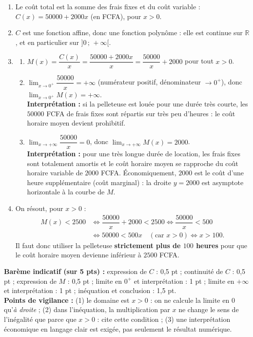 \documentclass[11pt]{article}
\begin{document}
\begin{corrige}
\begin{enumerate}
\item Le coût total est la somme des frais fixes et du coût variable : $C(x)=50000+2000x$ (en FCFA), pour $x>0$.
\item $C$ est une fonction affine, donc une fonction polynôme : elle est continue sur $\mathbb{R}$, et en particulier sur $]0\,;\,+\infty[$.
\item \begin{enumerate}
\item $M(x)=\dfrac{C(x)}{x}=\dfrac{50000+2000x}{x}=\dfrac{50000}{x}+2000$ pour tout $x>0$.
\item $\displaystyle\lim_{x\to 0^+}\dfrac{50000}{x}=+\infty$ (numérateur positif, dénominateur $\to 0^+$), donc $\displaystyle\lim_{x\to 0^+}M(x)=+\infty$.\\
\textbf{Interprétation :} si la pelleteuse est louée pour une durée très courte, les $50000$ FCFA de frais fixes sont répartis sur très peu d'heures : le coût horaire moyen devient prohibitif.
\item $\displaystyle\lim_{x\to+\infty}\dfrac{50000}{x}=0$, donc $\displaystyle\lim_{x\to+\infty}M(x)=2000$.\\
\textbf{Interprétation :} pour une très longue durée de location, les frais fixes sont totalement amortis et le coût horaire moyen se rapproche du coût horaire variable de $2000$ FCFA. Économiquement, $2000$ est le coût d'une heure supplémentaire (coût marginal) : la droite $y=2000$ est asymptote horizontale à la courbe de $M$.
\end{enumerate}
\item On résout, pour $x>0$ :
\begin{align*}
M(x)<2500 &\iff \dfrac{50000}{x}+2000<2500 \iff \dfrac{50000}{x}<500 \\
&\iff 50000<500x \quad(\text{car } x>0) \iff x>100.
\end{align*}
Il faut donc utiliser la pelleteuse \textbf{strictement plus de $100$ heures} pour que le coût horaire moyen devienne inférieur à $2500$ FCFA.
\end{enumerate}
\textbf{Barème indicatif (sur 5 pts) :} expression de $C$ : 0,5 pt ; continuité de $C$ : 0,5 pt ; expression de $M$ : 0,5 pt ; limite en $0^+$ et interprétation : 1 pt ; limite en $+\infty$ et interprétation : 1 pt ; inéquation et conclusion : 1,5 pt.\\
\textbf{Points de vigilance :} (1) le domaine est $x>0$ : on ne calcule la limite en $0$ qu'\emph{à droite} ; (2) dans l'inéquation, la multiplication par $x$ ne change le sens de l'inégalité que parce que $x>0$ : cite cette condition ; (3) une interprétation économique en langage clair est exigée, pas seulement le résultat numérique.
\end{corrige}
\end{document}
